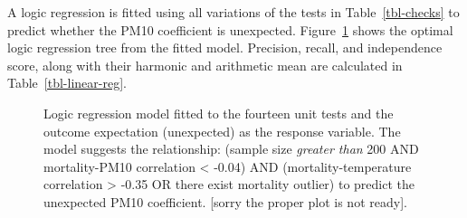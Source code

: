\documentclass[
  12pt,
]{interact}
\begin{document}
A logic regression is fitted using all variations of the tests in
Table~\ref{tbl-checks} to predict whether the PM10 coefficient is
unexpected. Figure~\ref{fig-linear-reg-tree} shows the optimal logic
regression tree from the fitted model. Precision, recall, and
independence score, along with their harmonic and arithmetic mean are
calculated in Table~\ref{tbl-linear-reg}.

\begin{figure}


\caption{\label{fig-linear-reg-tree}Logic regression model fitted to the
fourteen unit tests and the outcome expectation (unexpected) as the
response variable. The model suggests the relationship: (sample size
\emph{greater than} 200 AND mortality-PM10 correlation \textless{}
-0.04) AND (mortality-temperature correlation \textgreater{} -0.35 OR
there exist mortality outlier) to predict the unexpected PM10
coefficient. {[}sorry the proper plot is not ready{]}.}

\end{figure}%
\end{document}

